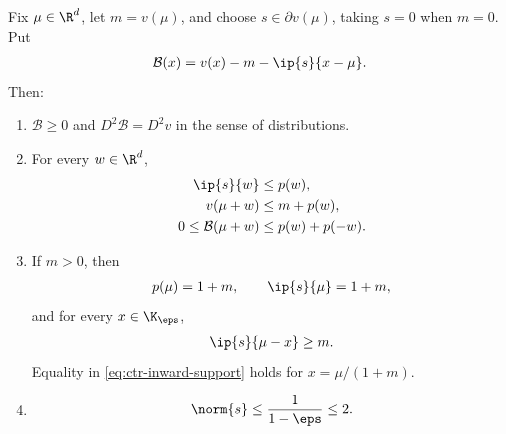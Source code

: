 \begin{lemma}
    \label{lem:ctr-tangent-geometry}
    Fix $\mu\in\R^d$, let $m=v(\mu)$, and choose
    $s\in\partial v(\mu)$, taking $s=0$ when $m=0$.  Put
    \begin{align}
        \mathcal B(x)=v(x)-m-\ip{s}{x-\mu}.
    \end{align}
    Then:
    \begin{enumerate}
        \item $\mathcal B\geq0$ and $D^2\mathcal B=D^2v$ in the sense of
              distributions.
        \item For every $w\in\R^d$,
              \begin{align}
                  \ip{s}{w}              & \leq p(w),
                  \label{eq:ctr-recession-subgradient}
                  \\
                  v(\mu+w)               & \leq m+p(w),
                  \label{eq:ctr-v-increment}
                  \\
                  0\leq\mathcal B(\mu+w) & \leq p(w)+p(-w).
                  \label{eq:ctr-B-pointwise}
              \end{align}
        \item If $m>0$, then
              \begin{align}
                  p(\mu)=1+m,
                  \qquad
                  \ip{s}{\mu}=1+m,
                  \label{eq:ctr-Euler}
              \end{align}
              and for every $x\in\K_\eps$,
              \begin{align}
                  \ip{s}{\mu-x}\geq m.
                  \label{eq:ctr-inward-support}
              \end{align}
              Equality in \eqref{eq:ctr-inward-support} holds for
              $x=\mu/(1+m)$.
        \item
              \begin{align}
                  \norm{s}\leq\frac1{1-\eps}\leq2.
                  \label{eq:ctr-s-Euclidean}
              \end{align}
    \end{enumerate}
\end{lemma}

